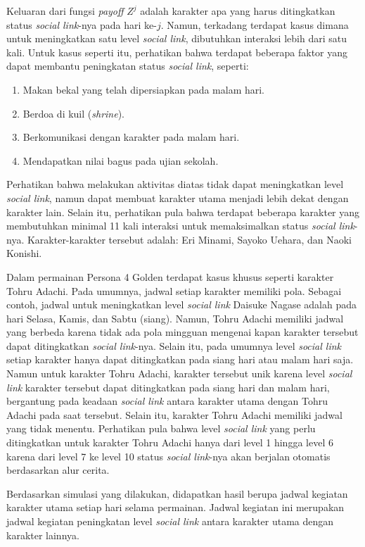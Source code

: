 Keluaran dari fungsi \textit{payoff} $Z^{j}$ adalah karakter apa yang harus ditingkatkan status \textit{social link}-nya pada hari ke-$j$. Namun, terkadang terdapat kasus dimana untuk meningkatkan satu level \textit{social link}, dibutuhkan interaksi lebih dari satu kali. Untuk kasus seperti itu, perhatikan bahwa terdapat beberapa faktor yang dapat membantu peningkatan status \textit{social link}, seperti:
\begin{enumerate}
    \item Makan bekal yang telah dipersiapkan pada malam hari.
    \item Berdoa di kuil (\textit{shrine}).
    \item Berkomunikasi dengan karakter pada malam hari.
    \item Mendapatkan nilai bagus pada ujian sekolah.
\end{enumerate}

Perhatikan bahwa melakukan aktivitas diatas tidak dapat meningkatkan level \textit{social link}, namun dapat membuat karakter utama menjadi lebih dekat dengan karakter lain. Selain itu, perhatikan pula bahwa terdapat beberapa karakter yang membutuhkan minimal 11 kali interaksi untuk memaksimalkan status \textit{social link}-nya. Karakter-karakter tersebut adalah: Eri Minami, Sayoko Uehara, dan Naoki Konishi.

Dalam permainan Persona 4 Golden terdapat kasus khusus seperti karakter Tohru Adachi. Pada umumnya, jadwal setiap karakter memiliki pola. Sebagai contoh, jadwal untuk meningkatkan level \textit{social link} Daisuke Nagase adalah pada hari Selasa, Kamis, dan Sabtu (siang). Namun, Tohru Adachi memiliki jadwal yang berbeda karena tidak ada pola mingguan mengenai kapan karakter tersebut dapat ditingkatkan \textit{social link}-nya. Selain itu, pada umumnya level \textit{social link} setiap karakter hanya dapat ditingkatkan pada siang hari atau malam hari saja. Namun untuk karakter Tohru Adachi, karakter tersebut unik karena level \textit{social link} karakter tersebut dapat ditingkatkan pada siang hari dan malam hari, bergantung pada keadaan \textit{social link} antara karakter utama dengan Tohru Adachi pada saat tersebut. Selain itu, karakter Tohru Adachi memiliki jadwal yang tidak menentu. Perhatikan pula bahwa level \textit{social link} yang perlu ditingkatkan untuk karakter Tohru Adachi hanya dari level 1 hingga level 6 karena dari level 7 ke level 10 status \textit{social link}-nya akan berjalan otomatis berdasarkan alur cerita.

Berdasarkan simulasi yang dilakukan, didapatkan hasil berupa jadwal kegiatan karakter utama setiap hari selama permainan. Jadwal kegiatan ini merupakan jadwal kegiatan peningkatan level \textit{social link} antara karakter utama dengan karakter lainnya.


